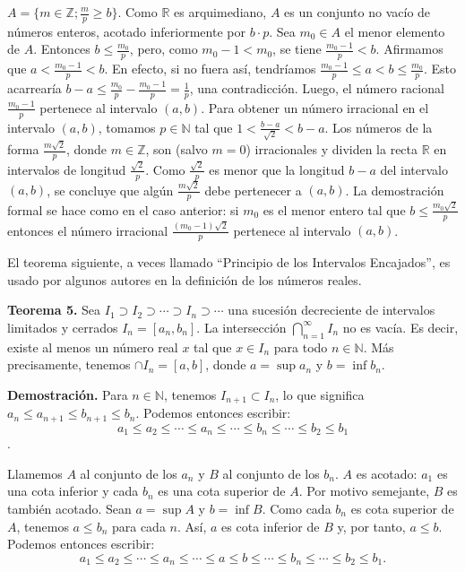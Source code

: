 \documentclass[12pt,oneside]{book}
\begin{document}
\(A = \{m \in \mathbb{Z}; \frac{m}{p} \geq b\}\). Como \(\mathbb{R}\) es arquimediano, \(A\) es un conjunto no vacío de números enteros, acotado inferiormente por \(b \cdot p\). Sea \(m_0 \in A\) el menor elemento de \(A\). Entonces \(b \leq \frac{m_0}{p}\), pero, como \(m_0 - 1 < m_0\), se tiene \(\frac{m_0 - 1}{p} < b\). Afirmamos que \(a < \frac{m_0 - 1}{p} < b\). En efecto, si no fuera así, tendríamos \(\frac{m_0 - 1}{p} \leq a < b \leq \frac{m_0}{p}\). Esto acarrearía \(b - a \leq \frac{m_0}{p} - \frac{m_0 - 1}{p} = \frac{1}{p}\), una contradicción. Luego, el número racional \(\frac{m_0 - 1}{p}\) pertenece al intervalo \((a, b)\). Para obtener un número irracional en el intervalo \((a, b)\), tomamos \(p \in \mathbb{N}\) tal que \(1 < \frac{b - a}{\sqrt{2}} < b - a\). Los números de la forma \(\frac{m\sqrt{2}}{p}\), donde \(m \in \mathbb{Z}\), son (salvo \(m = 0\)) irracionales y dividen la recta \(\mathbb{R}\) en intervalos de longitud \(\frac{\sqrt{2}}{p}\). Como \(\frac{\sqrt{2}}{p}\) es menor que la longitud \(b - a\) del intervalo \((a, b)\), se concluye que algún \(\frac{m\sqrt{2}}{p}\) debe pertenecer a \((a, b)\). La demostración formal se hace como en el caso anterior: si \(m_0\) es el menor entero tal que \(b \leq \frac{m_0\sqrt{2}}{p}\) entonces el número irracional \(\frac{(m_0 - 1)\sqrt{2}}{p}\) pertenece al intervalo \((a, b)\).

El teorema siguiente, a veces llamado “Principio de los Intervalos Encajados”, es usado por algunos autores en la definición de los números reales.

\textbf{Teorema 5.} Sea \(I_1 \supset I_2 \supset \cdots \supset I_n \supset \cdots\) una sucesión decreciente de intervalos limitados y cerrados \(I_n = [a_n, b_n]\). La intersección \(\bigcap_{n=1}^{\infty} I_n\) no es vacía. Es decir, existe al menos un número real \(x\) tal que \(x \in I_n\) para todo \(n \in \mathbb{N}\). Más precisamente, tenemos \(\cap I_n = [a, b]\), donde \(a = \sup a_n\) y \(b = \inf b_n\).

\textbf{Demostración.} Para \(n \in \mathbb{N}\), tenemos \(I_{n+1} \subset I_n\), lo que significa \(a_n \leq a_{n+1} \leq b_{n+1} \leq b_n\). Podemos entonces escribir:
\[a_1 \leq a_2 \leq \cdots \leq a_n \leq \cdots \leq b_n \leq \cdots \leq b_2 \leq b_1\].

Llamemos \(A\) al conjunto de los \(a_n\) y \(B\) al conjunto de los \(b_n\). \(A\) es acotado: \(a_1\) es una cota inferior y cada \(b_n\) es una cota superior de \(A\). Por motivo semejante, \(B\) es también acotado. Sean \(a = \sup A\) y \(b = \inf B\). Como cada \(b_n\) es cota superior de \(A\), tenemos \(a \leq b_n\) para cada \(n\). Así, \(a\) es cota inferior de \(B\) y, por tanto, \(a \leq b\). Podemos entonces escribir:
\[a_1 \leq a_2 \leq \cdots \leq a_n \leq \cdots \leq a \leq b \leq \cdots \leq b_n \leq \cdots \leq b_2 \leq b_1.\]
\end{document}
